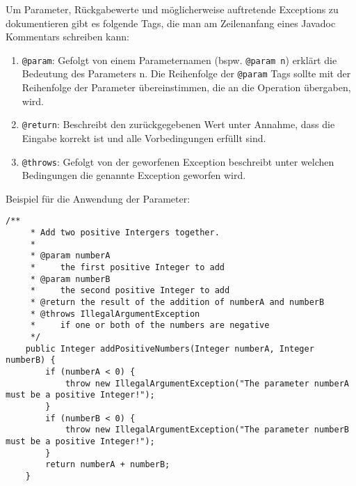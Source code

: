 \begin{Infobox}
    Um Parameter, Rückgabewerte und möglicherweise auftretende Exceptions zu dokumentieren gibt es folgende Tags, die man am Zeilenanfang eines Javadoc Kommentars schreiben kann:

\begin{enumerate}[label=\roman*)]
\item \lstinline{@param}:
Gefolgt von einem Parameternamen (bspw. \lstinline{@param n}) erklärt die Bedeutung des Parameters n.
Die Reihenfolge der \lstinline{@param} Tags sollte mit der Reihenfolge der Parameter übereinstimmen, die an die Operation übergaben, wird.
\item \lstinline{@return}:
Beschreibt den zurückgegebenen Wert unter Annahme, dass die Eingabe korrekt ist und alle Vorbedingungen erfüllt sind.
\item \lstinline{@throws}:
Gefolgt von der geworfenen Exception beschreibt unter welchen Bedingungen die genannte Exception geworfen wird.
\end{enumerate}

Beispiel für die Anwendung der Parameter:

    \begin{lstlisting}[numbers=none]
    /**
     * Add two positive Intergers together.
     * 
     * @param numberA
     *     the first positive Integer to add
     * @param numberB
     *     the second positive Integer to add
     * @return the result of the addition of numberA and numberB
     * @throws IllegalArgumentException
     *     if one or both of the numbers are negative
     */
    public Integer addPositiveNumbers(Integer numberA, Integer numberB) {
        if (numberA < 0) {
            throw new IllegalArgumentException("The parameter numberA must be a positive Integer!");
        }
        if (numberB < 0) {
            throw new IllegalArgumentException("The parameter numberB must be a positive Integer!");
        }
        return numberA + numberB;
    }
    \end{lstlisting}
\end{Infobox}
